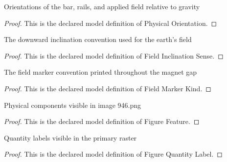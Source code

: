 \begin{definition}
  \label{def:physics:phyx-mini-0946:phyxminiproblems-problemphyxmini0946-physicalorientation}
  Orientations of the bar, rails, and applied field relative to gravity
\end{definition}
\begin{proof}
  This is the declared model definition of Physical Orientation.
\end{proof}
\begin{definition}
  \label{def:physics:phyx-mini-0946:phyxminiproblems-problemphyxmini0946-fieldinclinationsense}
  The downward inclination convention used for the earth's field
\end{definition}
\begin{proof}
  This is the declared model definition of Field Inclination Sense.
\end{proof}
\begin{definition}
  \label{def:physics:phyx-mini-0946:phyxminiproblems-problemphyxmini0946-fieldmarkerkind}
  The field marker convention printed throughout the magnet gap
\end{definition}
\begin{proof}
  This is the declared model definition of Field Marker Kind.
\end{proof}
\begin{definition}
  \label{def:physics:phyx-mini-0946:phyxminiproblems-problemphyxmini0946-figurefeature}
  Physical components visible in image 946.png
\end{definition}
\begin{proof}
  This is the declared model definition of Figure Feature.
\end{proof}
\begin{definition}
  \label{def:physics:phyx-mini-0946:phyxminiproblems-problemphyxmini0946-figurequantitylabel}
  Quantity labels visible in the primary raster
\end{definition}
\begin{proof}
  This is the declared model definition of Figure Quantity Label.
\end{proof}
